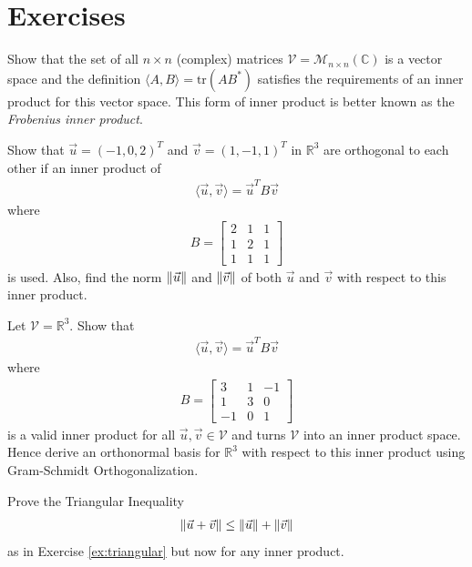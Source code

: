 \section{Exercises}

\begin{Exercise}
Show that the set of all $n \times n$ (complex) matrices $\mathcal{V} = \mathcal{M}_{n \times n}(\mathbb{C})$ is a vector space and the definition $\langle A, B\rangle = \text{tr}(AB^*)$ satisfies the requirements of an inner product for this vector space. This form of inner product is better known as the \textit{Frobenius inner product}.
\end{Exercise}

\begin{Exercise}
Show that $\vec{u} = (-1,0,2)^T$ and $\vec{v} = (1,-1,1)^T$ in $\mathbb{R}^3$ are orthogonal to each other if an inner product of
\begin{align*}
\langle\vec{u}, \vec{v}\rangle = \vec{u}^TB\vec{v}
\end{align*}
where 
\begin{align*}
B = 
\begin{bmatrix}
2 & 1 & 1 \\
1 & 2 & 1 \\
1 & 1 & 1
\end{bmatrix}
\end{align*}
is used. Also, find the norm $\norm{\vec{u}}$ and $\norm{\vec{v}}$ of both $\vec{u}$ and $\vec{v}$ with respect to this inner product.
\end{Exercise}

\begin{Exercise}
Let $\mathcal{V} = \mathbb{R}^3$. Show that
\begin{align*}
\langle\vec{u}, \vec{v}\rangle = \vec{u}^TB\vec{v}
\end{align*}
where 
\begin{align*}
B = 
\begin{bmatrix}
3 & 1 & -1 \\ 
1 & 3 & 0 \\ 
-1 & 0 & 1
\end{bmatrix}
\end{align*}
is a valid inner product for all $\vec{u}, \vec{v} \in \mathcal{V}$ and turns $\mathcal{V}$ into an inner product space. Hence derive an orthonormal basis for $\mathbb{R}^3$ with respect to this inner product using Gram-Schmidt Orthogonalization. 
\end{Exercise}

\begin{Exercise}
\label{ex:triangular2}
Prove the Triangular Inequality
\begin{align*}
\norm{\vec{u} + \vec{v}} \leq \norm{\vec{u}} + \norm{\vec{v}}
\end{align*}
as in Exercise \ref{ex:triangular} but now for any inner product.
\end{Exercise}

